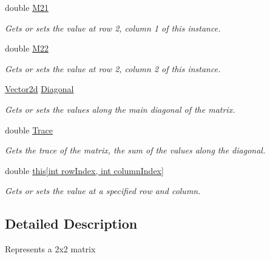 \begin{DoxyCompactItemize}
double \hyperlink{struct_open_t_k_1_1_matrix2d_ad19b24c7efeb4c57d2e1699cfaa83ce6}{M21}
\begin{DoxyCompactList}\small\item\em Gets or sets the value at row 2, column 1 of this instance. \end{DoxyCompactList}\item 
double \hyperlink{struct_open_t_k_1_1_matrix2d_a9c1ec28306c424ea27ad51e8fe902ac4}{M22}
\begin{DoxyCompactList}\small\item\em Gets or sets the value at row 2, column 2 of this instance. \end{DoxyCompactList}\item 
\hyperlink{struct_open_t_k_1_1_vector2d}{Vector2d} \hyperlink{struct_open_t_k_1_1_matrix2d_a2c4c37b943b8fe801b135547ba7858a4}{Diagonal}
\begin{DoxyCompactList}\small\item\em Gets or sets the values along the main diagonal of the matrix. \end{DoxyCompactList}\item 
double \hyperlink{struct_open_t_k_1_1_matrix2d_a2619c170f3a0fa088a1bb773c8e4ebbe}{Trace}
\begin{DoxyCompactList}\small\item\em Gets the trace of the matrix, the sum of the values along the diagonal. \end{DoxyCompactList}\item 
double \hyperlink{struct_open_t_k_1_1_matrix2d_a116d94c4beb666660efc500e09af27f2}{this\mbox{[}int row\-Index, int column\-Index\mbox{]}}
\begin{DoxyCompactList}\small\item\em Gets or sets the value at a specified row and column. \end{DoxyCompactList}\end{DoxyCompactItemize}


\subsection{Detailed Description}
Represents a 2x2 matrix 



